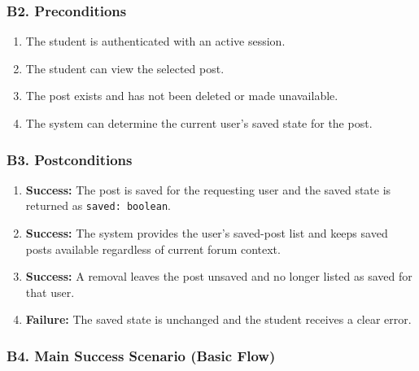 \documentclass[12pt]{article}
\begin{document}
\hypertarget{sec:b2-preconditions}{}
\subsubsection*{B2. Preconditions}
\par\medskip

\begin{enumerate}
\item The student is authenticated with an active session.
\item The student can view the selected post.
\item The post exists and has not been deleted or made unavailable.
\item The system can determine the current user's saved state for the post.
\end{enumerate}
\par\medskip

\hypertarget{sec:b3-postconditions}{}
\subsubsection*{B3. Postconditions}
\par\medskip

\begin{enumerate}
\item \textbf{Success:} The post is saved for the requesting user and the saved state is returned as \texttt{saved: boolean}.
\item \textbf{Success:} The system provides the user's saved-post list and keeps saved posts available regardless of current forum context.
\item \textbf{Success:} A removal leaves the post unsaved and no longer listed as saved for that user.
\item \textbf{Failure:} The saved state is unchanged and the student receives a clear error.
\end{enumerate}
\par\medskip

\hypertarget{sec:b4-main-success-scenario-basic-flow}{}
\subsubsection*{B4. Main Success Scenario (Basic Flow)}
\par\medskip
\end{document}
